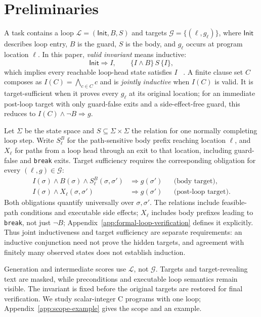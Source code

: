 \section{Preliminaries}\label{sec:preliminaries}

A task contains a loop \(\mathcal L=(\mathsf{Init},B,S)\) and targets
\(\mathcal G=\{(\ell,g_\ell)\}\), where \(\mathsf{Init}\) describes loop entry,
\(B\) is the guard, \(S\) is the body, and \(g_\ell\) occurs at program
location \(\ell\).  In this paper, \emph{valid invariant} means inductive:
\[
  \mathsf{Init}\Rightarrow I,
  \qquad
  \{I\wedge B\}\,S\,\{I\},
\]
which implies every reachable loop-head state satisfies \(I\)
~\citep{floyd1967assigning,hoare1969axiomatic}.  A finite clause set \(C\)
composes as \(I(C)=\bigwedge_{c\in C}c\) and is \emph{jointly inductive} when
\(I(C)\) is valid.  It is target-sufficient when it proves every \(g_\ell\) at
its original location; for an immediate post-loop target with only
guard-false exits and a side-effect-free guard, this reduces to
\(I(C)\wedge\neg B\Rightarrow g\).

Let \(\Sigma\) be the state space and \(S\subseteq\Sigma\times\Sigma\)
the relation for one normally completing loop step.  Write
\(S^B_\ell\) for the path-sensitive body prefix reaching location \(\ell\),
and \(X_\ell\) for paths from a loop head through an exit to that location,
including guard-false and \texttt{break} exits.  Target
sufficiency requires the corresponding obligation for every \((\ell,g)\in\mathcal G\):
\begin{align}
 I(\sigma)\land B(\sigma)\land S^B_\ell(\sigma,\sigma')
   &\Rightarrow g(\sigma') &&\text{(body target)},\nonumber\\
 I(\sigma)\land X_\ell(\sigma,\sigma')
   &\Rightarrow g(\sigma') &&\text{(post-loop target)}.
 \label{eq:main-target-obligations}
\end{align}
Both obligations quantify universally over \(\sigma,\sigma'\).
The relations include feasible-path conditions and executable side effects;
\(X_\ell\) includes body prefixes leading to \texttt{break}, not just
\(\neg B\); Appendix~\ref{app:formal-loop-verification} defines it explicitly.
Thus joint inductiveness and target sufficiency are separate requirements:
an inductive conjunction need not prove the hidden targets, and agreement
with finitely many observed states does not establish induction.

Generation and intermediate scores use \(\mathcal L\), not \(\mathcal G\).
Targets and target-revealing text are masked, while preconditions and executable
loop semantics remain visible.  The invariant is fixed before the original
targets are restored for final verification.  We study scalar-integer C
programs with one loop; Appendix~\ref{app:scope-example} gives the scope and an
example.
